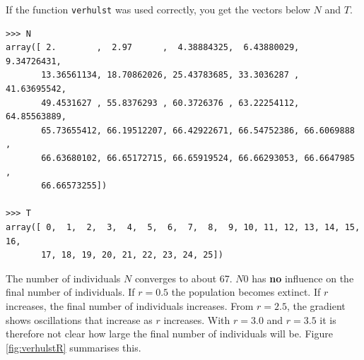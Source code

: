 \begin{Answer}\phantom{}
    \Question If the function \texttt{verhulst} was used correctly, you get the vectors below $N$ and $T$.
        \begin{lstlisting}
>>> N
array([ 2.        ,  2.97      ,  4.38884325,  6.43880029,  9.34726431,
       13.36561134, 18.70862026, 25.43783685, 33.3036287 , 41.63695542,
       49.4531627 , 55.8376293 , 60.3726376 , 63.22254112, 64.85563889,
       65.73655412, 66.19512207, 66.42922671, 66.54752386, 66.6069888 ,
       66.63680102, 66.65172715, 66.65919524, 66.66293053, 66.6647985 ,
       66.66573255])

>>> T
array([ 0,  1,  2,  3,  4,  5,  6,  7,  8,  9, 10, 11, 12, 13, 14, 15, 16,
       17, 18, 19, 20, 21, 22, 23, 24, 25])
        \end{lstlisting}	
	\Question The number of individuals $N$ converges to about 67.
	\Question $N0$ has \textbf{no} influence on the final number of individuals.
	\Question If $r = 0.5$ the population becomes extinct. If $r$ increases, the final number of individuals increases. From $r = 2.5$, the gradient shows oscillations that increase as $r$ increases. With $r = 3.0$ and $r = 3.5$ it is therefore not clear how large the final number of individuals will be. Figure
    \ref{fig:verhulstR} summarises this.
	\EndCurrentQuestion
\end{Answer}

